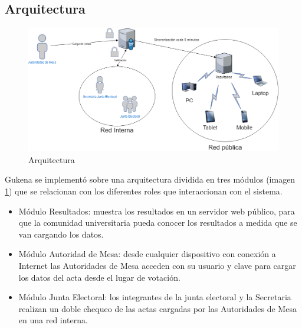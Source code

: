 \subsection{Arquitectura}

\begin{figure}[h!]
  \includegraphics[width=\textwidth]{img/arquitectura.png}
  \caption{Arquitectura}
  \label{graf:arquitectura}
\end{figure}

Gukena se implementó sobre una arquitectura dividida en tres módulos (imagen \ref{graf:arquitectura}) que se relacionan con los diferentes roles que interaccionan con el sistema.
\begin{itemize}
\item Módulo Resultados: muestra los resultados en un servidor web público, para que la comunidad universitaria pueda conocer los resultados a medida que se van cargando los datos.
\item Módulo Autoridad de Mesa: desde cualquier dispositivo con conexión a Internet las Autoridades de Mesa acceden con su usuario y clave para cargar los datos del acta desde el lugar de votación.
\item Módulo Junta Electoral: los integrantes de la junta electoral y la Secretaria realizan un doble chequeo de las actas cargadas por las Autoridades de Mesa en una red interna.
\end{itemize}

